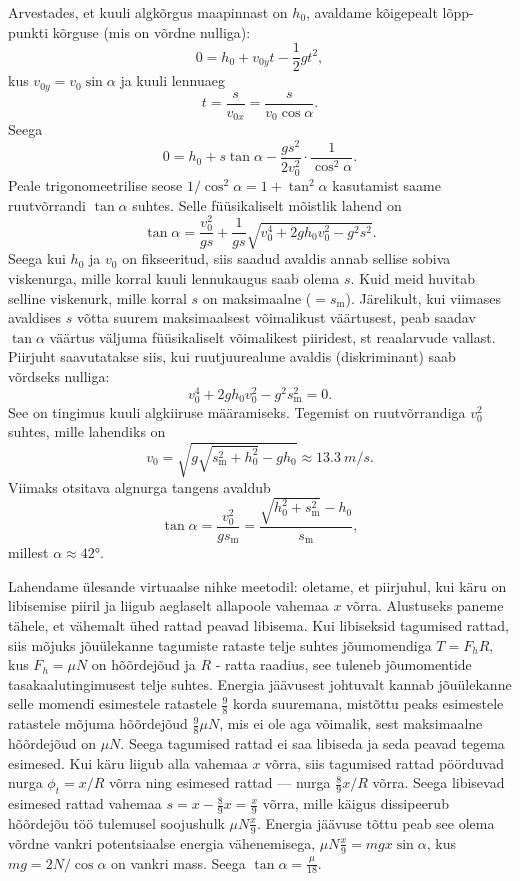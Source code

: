 \documentclass[10pt]{article}
\begin{document}
Arvestades, et kuuli algkõrgus maapinnast on $h_0$, avaldame kõigepealt lõpp-punkti kõrguse (mis on võrdne nulliga):
\[
0=h_0+v_{0y}t-\frac{1}{2}gt^2,
\]
kus $v_{0y}=v_0\sin\alpha$ ja kuuli lennuaeg
\[
t=\frac{s}{v_{0x}}=\frac{s}{v_0\cos\alpha}.
\]
Seega
\[
0=h_0+s\tan\alpha-\frac{gs^2}{2v_0^2}\cdot\frac{1}{\cos^2\alpha}.
\]
Peale trigonomeetrilise seose $1/\cos^2\alpha=1+\tan^2\alpha$ kasutamist saame ruutvõrrandi $\tan\alpha$ suhtes. Selle füüsikaliselt mõistlik lahend on
\[
\tan\alpha=\frac{v_0^2}{gs}+\frac{1}{gs}\sqrt{v_0^4+2gh_0v_0^2-g^2s^2}.
\]
Seega kui $h_0$ ja $v_0$ on fikseeritud, siis saadud avaldis annab sellise sobiva viskenurga, mille korral kuuli lennukaugus saab olema $s$. Kuid meid huvitab selline viskenurk, mille korral $s$ on maksimaalne ($=s_\text{m}$). Järelikult, kui viimases avaldises $s$ võtta suurem maksimaalsest võimalikust väärtusest, peab saadav $\tan\alpha$ väärtus väljuma füüsikaliselt võimalikest piiridest, st reaalarvude vallast. Piirjuht saavutatakse siis, kui ruutjuurealune avaldis (diskriminant) saab võrdseks nulliga:
\[
v_0^4+2gh_0v_0^2-g^2s_\text{m}^2=0.
\]
See on tingimus kuuli algkiiruse määramiseks. Tegemist on ruutvõrrandiga $v_0^2$ suhtes, mille lahendiks on
\[
v_0=\sqrt{g\sqrt{s_\text{m}^2+h_0^2}-gh_0}\approx \SI{13.3}{m/s}.
\]
Viimaks otsitava algnurga tangens avaldub
\[
\tan\alpha=\frac{v_0^2}{gs_\text{m}}=\frac{\sqrt{h_0^2+s_\text{m}^2}-h_0}{s_\text{m}},
\]
millest $\alpha\approx\ang{42}$.
\probend
\bigskip


\solu
Lahendame ülesande virtuaalse nihke meetodil: oletame, et piirjuhul, kui käru on libisemise piiril ja liigub aeglaselt allapoole vahemaa $x$ võrra. Alustuseks paneme tähele, et vähemalt ühed rattad peavad libisema. Kui libiseksid tagumised rattad, siis mõjuks jõuülekanne tagumiste rataste telje suhtes jõumomendiga $T=F_hR$, kus $F_h=\mu N$ on hõõrdejõud ja $R$ - ratta raadius, see tuleneb jõumomentide tasakaalutingimusest telje suhtes. Energia jäävusest johtuvalt kannab jõuülekanne selle momendi esimestele ratastele $\frac 98$ korda suuremana, mistõttu peaks esimestele ratastele mõjuma hõõrdejõud $\frac 98\mu N$, mis ei ole aga võimalik, sest maksimaalne hõõrdejõud on $\mu N$. Seega tagumised rattad ei saa libiseda ja seda peavad tegema esimesed. Kui käru liigub alla vahemaa $x$ võrra, siis  tagumised rattad pöörduvad nurga $\phi_t=x/R$ võrra ning esimesed rattad --- nurga $\frac 89x/R$ võrra. Seega libisevad esimesed rattad vahemaa $s=x-\frac 89x=\frac x9$ võrra, mille käigus dissipeerub hõõrdejõu töö tulemusel soojushulk $\mu N\frac x9$. Energia jäävuse tõttu peab see olema võrdne vankri potentsiaalse energia vähenemisega, $\mu N\frac x9=mgx\sin\alpha$, kus $mg=2N/\cos\alpha$ on vankri mass. Seega $\tan\alpha = \frac \mu{18}$.
\probend
\bigskip
\end{document}
